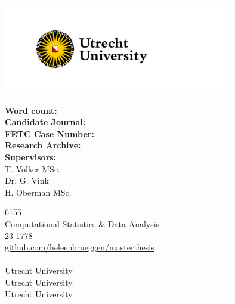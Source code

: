 \documentclass[10pt, a4paper, titlepage]{article}
\begin{document}
\begin{titlingpage}
\begin{center}
\vspace{4cm}

\begin{minipage}{.5\textwidth}
\begin{center}
            \includegraphics[width=10cm]{graphs/UU_logo_2021_EN_RGB.png}
\end{center}
\end{minipage}%
    
\vspace{.25cm}

\begin{minipage}{0.5\textwidth}
\begin{flushleft}

\textbf{Word count:} \\
\textbf{Candidate Journal:} \\
\textbf{FETC Case Number:} \\
\textbf{Research Archive:} \\
\textbf{Supervisors:} \\
T. Volker MSc. \\
Dr. G. Vink \\
H. Oberman MSc.
\end{flushleft}
\end{minipage}%
\begin{minipage}{0.5\textwidth}
\begin{flushright}

6155 \\ %
Computational Statistics \& Data Analysis \\
23-1778 \\
\url{github.com/heleenbrueggen/masterthesis} \\
------------------------\\
Utrecht University \\
Utrecht University \\
Utrecht University
\end{flushright}
\end{minipage}

\end{center}
\end{titlingpage}
\end{document}
